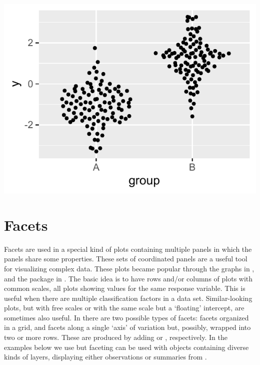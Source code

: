 \documentclass[krantz2]{krantz}\usepackage{knitr}
\begin{document}
\begin{knitrout}\footnotesize
{}\color{fgcolor}\begin{kframe}
\begin{alltt}
  \hlopt{+}
  \hlstd{()}
\end{alltt}
\end{kframe}

{\centering \includegraphics[width=.54\textwidth]{figure/pos-ggbeeswarm-plot-01-1} 

}


\end{knitrout}


\section{Facets}\label{sec:plot:facets}
Facets are used in a special kind of plots containing multiple panels in which the panels share some properties.
These sets of coordinated panels are a useful tool for visualizing complex data. These plots became popular through the  graphs in , and the  package in \Rlang. The basic idea is to have rows and/or columns of plots with common scales, all plots showing values for the same response variable. This is useful when there are multiple classification factors in a data set. Similar-looking plots, but with free scales or with the same scale but a `floating' intercept, are sometimes also useful. In \ggplot there are two possible types of facets: facets organized in a grid, and facets along a single `axis' of variation but, possibly, wrapped into two or more rows. These are produced by adding  or , respectively. In the examples below we use  but faceting can be used with  objects containing diverse kinds of layers, displaying either observations or summaries from .
\end{document}
